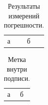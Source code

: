 \begin{table}
  \caption{Результаты измерений погрешности.} %
  \label{tab:results}
  \begin{tabular}{ll}
    а & б \\
  \end{tabular}
\end{table}

\begin{table}
  \caption{Метка внутри подписи.\label{tab:inside}} %
  \begin{tabular}{ll}
    а & б \\
  \end{tabular}
\end{table}
